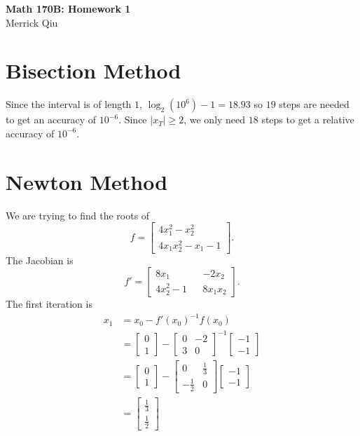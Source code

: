 \documentclass{article}
\begin{document}
\begin{center}
	\huge{\bf Math 170B: Homework 1} \\
	Merrick Qiu
\end{center}

\section*{Bisection Method}
Since the interval is of length $1$,
$\log_2(10^6)-1 = 18.93$ so $19$ steps are needed to get an accuracy of $10^{-6}$.
Since $|x_T| \geq 2$, we only need $18$ steps to get a relative accuracy of $10^{-6}$.
\newpage 

\section*{Newton Method}
We are trying to find the roots of
\[
	f = \begin{bmatrix}
		4x_1^2 - x_2^2 \\
		4x_1x_2^2 - x_1 - 1
	\end{bmatrix}.
\]
The Jacobian is 
\[
	f' = \begin{bmatrix}
		8x_1  && -2x_2\\
		4x_2^2 - 1 && 8x_1x_2
	\end{bmatrix}.
\]
The first iteration is 
\begin{align*}
	x_1 &= x_0 - f'(x_0)^{-1}f(x_0) \\
	&= \begin{bmatrix}
		0 \\ 1
	\end{bmatrix} -
	\begin{bmatrix}
		0 & -2 \\
		3 & 0
	\end{bmatrix}^{-1}
	\begin{bmatrix}
		-1 \\
		-1
	\end{bmatrix} \\
	&= \begin{bmatrix}
		0 \\ 1
	\end{bmatrix} -
	\begin{bmatrix}
		0 & \frac{1}{3} \\
		-\frac{1}{2} & 0
	\end{bmatrix}
	\begin{bmatrix}
		-1 \\
		-1
	\end{bmatrix} \\
	&= \begin{bmatrix}
		\frac{1}{3} \\ \frac{1}{2}
	\end{bmatrix}
\end{align*}
\end{document}
